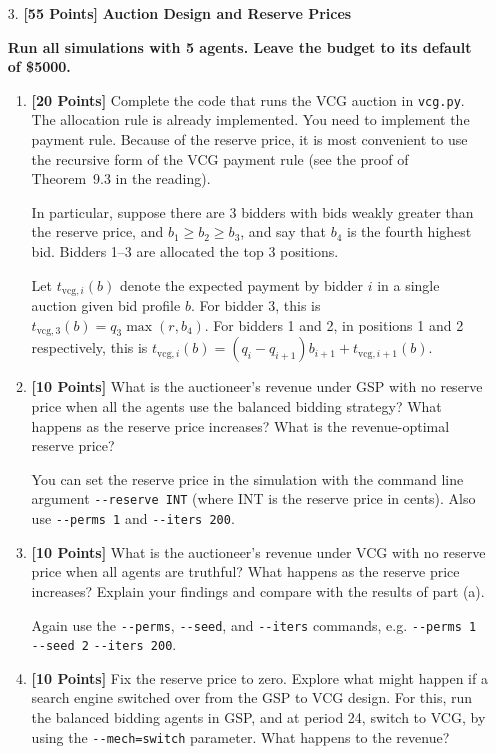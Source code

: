 \documentclass[11pt]{article}
\newcommand{\points}[1]{\textbf{[#1 Points]}}
\begin{document}
\begin{enumerate}
		\item[3.] \points{55} {\bf Auction Design and Reserve Prices}

{\bf Run all simulations with 5 agents. Leave the budget to its default
of \$5000.}

			\begin{enumerate}
\item \points{20} Complete the code that runs
the VCG auction in \verb+vcg.py+. The
allocation rule is already implemented. You need to implement the
payment rule. Because of the reserve price, it is most convenient to
use the recursive form 
of the VCG payment rule (see the proof of Theorem~9.3 in the 
reading).

In particular, suppose there are 3 bidders with bids weakly greater
than the reserve price, and $b_1\geq b_2\geq b_3$, and say that $b_4$
is the fourth highest bid. Bidders 1--3 are allocated the top 3
positions. 

Let $t_{\mathrm{vcg},i}(b)$ denote the expected payment by bidder $i$
in a single auction given bid profile $b$.  For bidder 3, this is
$t_{\mathrm{vcg},3}(b)=q_3 \max(r,b_{4})$. For bidders 1 and 2, in
positions 1 and 2 respectively, this is
$t_{\mathrm{vcg},i}(b)=(q_i-q_{i+1})b_{i+1} +t_{\mathrm{vcg},i+1}(b)$.


				\item \points{10} What is the auctioneer's revenue under GSP with no reserve price when all the agents use the balanced bidding strategy? What happens as the reserve price increases? What is the revenue-optimal reserve price? 

You can set the reserve price in the simulation with the command line argument \verb+--reserve INT+ (where INT is the reserve price in cents). Also use \verb+--perms 1+ and \verb+--iters 200+.
	

				
\item \points{10} What is the auctioneer's revenue under VCG with no
reserve price when all agents are truthful? What happens as the
reserve price increases? Explain your findings and compare with the
results of part (a).

				Again use the \verb+--perms+, \verb+--seed+, and \verb+--iters+ commands, e.g. \verb+--perms 1 --seed 2+ \verb+--iters 200+.
				
				
\item \points{10} Fix the reserve price to zero. 
Explore what might happen if a search engine
switched over from the GSP to VCG design.
For this, 
run the balanced bidding agents in 
GSP, and at period 24, switch to VCG, by using the \verb+--mech=switch+ parameter. What happens to the revenue?
%



\end{enumerate}
\end{enumerate}
\end{document}
